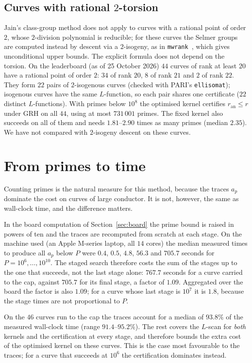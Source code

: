 \documentclass[11pt]{amsart}
\theoremstyle{remark}
\theoremstyle{definition}
\newcommand{\ran}{r_{\mathrm{an}}}
\begin{document}
\subsection*{\texorpdfstring{Curves with rational $2$-torsion}{Curves with rational 2-torsion}}\label{sec:torsion}
Jain's class-group method does not apply to curves with a rational point of order $2$, whose $2$-division polynomial is reducible; for these curves the Selmer groups are computed instead by descent via a $2$-isogeny, as in \texttt{mwrank}~\cite{Cremona}, which gives unconditional upper bounds. The explicit formula does not depend on the torsion. On the leaderboard (as of 25 October 2026) $44$ curves of rank at least $20$ have a rational point of order $2$: $34$ of rank $20$, $8$ of rank $21$ and $2$ of rank $22$. They form $22$ pairs of $2$-isogenous curves (checked with PARI's \texttt{ellisomat}); isogenous curves have the same $L$-function, so each pair shares one certificate ($22$ distinct $L$-functions). With primes below $10^{8}$ the optimised kernel certifies $\ran\le r$ under GRH on all $44$, using at most $731\,001$ primes. The fixed kernel also succeeds on all of them and needs $1.81$--$2.90$ times as many primes (median $2.35$). We have not compared with $2$-isogeny descent on these curves.

\section{From primes to time}
\label{sec:time}

Counting primes is the natural measure for this method, because the traces $a_p$ dominate the
cost on curves of large conductor. It is not, however, the same as wall-clock time, and the
difference matters.

In the board computation of Section~\ref{sec:board} the prime bound is raised in powers of ten and
the traces are recomputed from scratch at each stage. On the machine used (an Apple M-series laptop, all $14$ cores) the median measured times to produce all $a_p$ below $P$ were $0.4$, $0.5$, $4.8$, $56.3$ and
$705.7$ seconds for $P=10^6,\dots,10^{10}$. The staged search therefore costs the sum of the stages up
to the one that succeeds, not the last stage alone: $767.7$ seconds for a curve carried to the cap,
against $705.7$ for its final stage, a factor of $1.09$. Aggregated over the board the factor is also
$1.09$; for a curve whose last stage is $10^7$ it is $1.8$, because the stage times are not
proportional to $P$.

On the $46$ curves run to the cap the traces account for a median of $93.8\%$ of the measured wall-clock time (range $91.4$--$95.2\%$). The rest covers the $L$-scan for \emph{both} kernels and the certification at
every stage, and therefore bounds the extra cost of the optimised kernel on these curves. This is the case most favourable to the traces; for a curve that succeeds at
$10^6$ the certification dominates instead.
\end{document}
